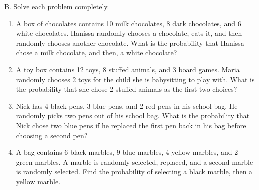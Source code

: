 B. Solve each problem completely. 
\begin{enumerate}[label = \arabic*. ]
\item A box of chocolates contains 10 milk chocolates, 8 dark chocolates, and 6 white chocolates. Hanissa randomly chooses a chocolate, eats 
it, and then randomly chooses another chocolate. What is the 
probability that Hanissa chose a milk chocolate, and then, a white chocolate? 

\item A toy box contains 12 toys, 8 stuffed animals, and 3 board games. Maria randomly chooses 2 toys for the child she is babysitting to play 
with. What is the probability that she chose 2 stuffed animals as the first two choices? 


\item Nick has 4 black pens, 3 blue pens, and 2 red pens in his school bag. He randomly picks two pens out of his school bag. What is the probability that Nick chose two blue pens if he replaced the first pen back in his bag before choosing a second pen? 
\item A bag contains 6 black marbles, 9 blue marbles, 4 yellow marbles, and 2 green marbles. A marble is randomly selected, replaced, and a second marble is randomly selected. Find the probability of selecting a black marble, then a yellow marble. 
\end{enumerate}   
